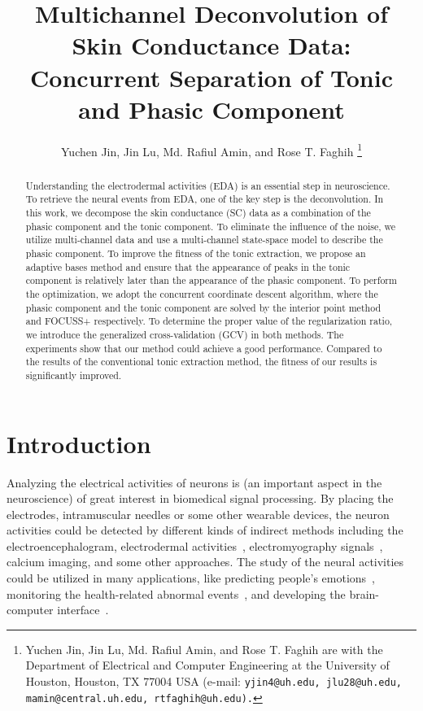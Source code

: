 \documentclass[10pt,conference]{ieeeconf}
\begin{document}
\title{Multichannel Deconvolution of Skin Conductance Data: Concurrent Separation of Tonic and Phasic Component}


\author{Yuchen Jin, Jin Lu, Md. Rafiul Amin, and Rose T. Faghih \thanks{Yuchen Jin, Jin Lu, Md. Rafiul Amin, and Rose T. Faghih are with the Department of Electrical and Computer Engineering at the University of Houston, Houston, TX 77004 USA (e-mail: \tt\small  yjin4@uh.edu, jlu28@uh.edu, mamin@central.uh.edu, rtfaghih@uh.edu).} 
}

\maketitle

\begin{abstract}

Understanding the electrodermal activities (EDA) is an essential step in neuroscience. To retrieve the neural events from EDA, one of the key step is the deconvolution. In this work, we decompose the skin conductance (SC) data as a combination of the phasic component and the tonic component. To eliminate the influence of the noise, we utilize multi-channel data and use a multi-channel state-space model to describe the phasic component. To improve the fitness of the tonic extraction, we propose an adaptive bases method and ensure that the appearance of peaks in the tonic component is relatively later than the appearance of the phasic component. To perform the optimization, we adopt the concurrent coordinate descent algorithm, where the phasic component and the tonic component are solved by the interior point method and FOCUSS+ respectively. To determine the proper value of the regularization ratio, we introduce the generalized cross-validation (GCV) in both methods. The experiments show that our method could achieve a good performance. Compared to the results of the conventional tonic extraction method, the fitness of our results is significantly improved.

\end{abstract}

\section{Introduction} \label{introduction}

Analyzing the electrical activities of neurons is (an important aspect in the neuroscience) of great interest in biomedical signal processing. By placing the electrodes, intramuscular needles or some other wearable devices, the neuron activities could be detected by different kinds of indirect methods including the electroencephalogram, electrodermal activities~\cite{savazzi2019estimation,jain2016compressed,amin2019robust}, electromyography signals~\cite{biagetti2016homomorphic}, calcium imaging, and some other approaches. The study of the neural activities could be utilized in many applications, like predicting people's emotions~\cite{feng2018wavelet}, monitoring the health-related abnormal events~\cite{said2017wearable}, and developing the brain-computer interface~\cite{de2018use}.
\end{document}
